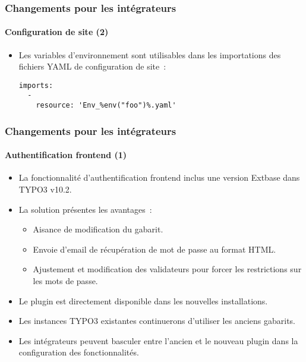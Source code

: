 \begin{frame}[fragile]
	\frametitle{Changements pour les intégrateurs}
	\framesubtitle{Configuration de site (2)}

	\lstset{basicstyle=\tiny\ttfamily}

	\begin{itemize}

		\item Les variables d'environnement sont utilisables dans les importations des fichiers YAML de
			configuration de site~:
\begin{lstlisting}
imports:
  -
    resource: 'Env_%env("foo")%.yaml'
\end{lstlisting}

	\end{itemize}

\end{frame}


\begin{frame}[fragile]
	\frametitle{Changements pour les intégrateurs}
	\framesubtitle{Authentification frontend (1)}

	\begin{itemize}

		\item La fonctionnalité d'authentification frontend inclus une version Extbase dans TYPO3 v10.2.
		\item La solution présentes les avantages~:

			\begin{itemize}
				\item Aisance de modification du gabarit.
				\item Envoie d'email de récupération de mot de passe au format HTML.
				\item Ajustement et modification des validateurs pour forcer les restrictions sur les mots de passe.
			\end{itemize}

		\item Le plugin est directement disponible dans les nouvelles installations.
		\item Les instances TYPO3 existantes continuerons d'utiliser les anciens gabarits.
		\item Les intégrateurs peuvent basculer entre l'ancien et le nouveau plugin dans la configuration des fonctionnalités.

	\end{itemize}

\end{frame}

